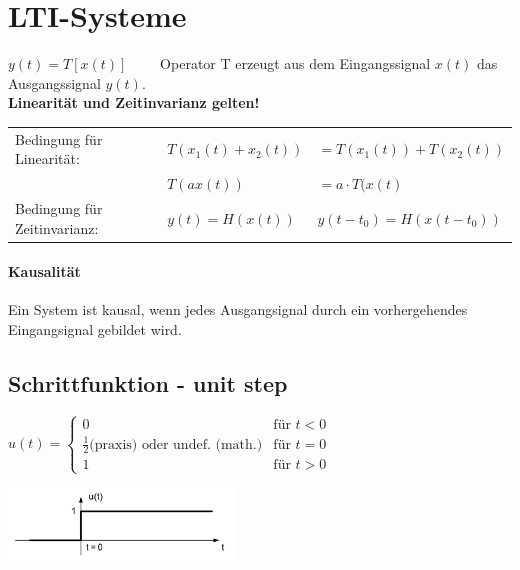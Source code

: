 \section{LTI-Systeme }
\begin{center}
	
\end{center}

$ y(t) = T [ x(t)] \qquad $ Operator T erzeugt aus dem Eingangssignal $ x(t) $ das Ausgangssignal $ y(t)$. \\
\textbf{Linearität und Zeitinvarianz gelten!}\\
\begin{tabular}{lll}
	Bedingung für Linearität: & $T(x_1(t)+x_2(t))$ & $= T(x_1(t)) + T(x_2(t))$ \\
	& $T(ax(t))$ & $= a\cdot T(x(t)$\\
	Bedingung für Zeitinvarianz: & $y(t) = H(x(t))$ & $y(t-t_0) = H(x(t-t_0))$ \\
\end{tabular}

	\paragraph{Kausalität} Ein System ist kausal, wenn jedes Ausgangsignal durch ein vorhergehendes Eingangsignal gebildet wird.
\\

\subsection{Schrittfunktion - unit step}
	\begin{minipage}{10cm}
		$u(t) =	\begin{cases}
	  		 0 & \text{für } t < 0 \\
	  		 \frac{1}{2} \text{(praxis)}  \text{ oder undef. (math.)} & \text{für } t = 0 \\
	  		 1 & \text{für } t > 0
	  	\end{cases}
		$
	\end{minipage}
	\begin{minipage}{8cm}
		\includegraphics[width=6cm]{bilder/unitstep.png}
	\end{minipage}


